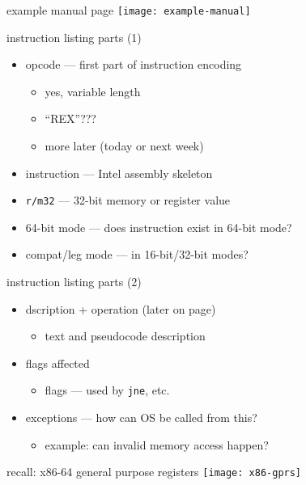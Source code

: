 \begin{frame}{example manual page}
\texttt{[image: example-manual]}
\end{frame}

\begin{frame}{instruction listing parts (1)}
    \begin{itemize}
    \item opcode --- first part of instruction encoding
        \begin{itemize}
        \item yes, variable length
        \item ``REX''???
        \item more later (today or next week)
        \end{itemize}
    \item instruction --- Intel assembly skeleton
    \item {\tt r/m32} --- 32-bit memory or register value
    \item 64-bit mode --- does instruction exist in 64-bit mode?
    \item compat/leg mode --- in 16-bit/32-bit modes?
    \end{itemize}
\end{frame}

\begin{frame}{instruction listing parts (2)}
    \begin{itemize}
    \item dscription + operation (later on page)
        \begin{itemize}
        \item text and pseudocode description
        \end{itemize}
    \item flags affected
        \begin{itemize}
        \item flags --- used by {\tt jne}, etc.
        \end{itemize}
    \item exceptions --- how can OS be called from this?
        \begin{itemize}
        \item example: can invalid memory access happen?
        \end{itemize}
    \end{itemize}
\end{frame}

\begin{frame}{recall: x86-64 general purpose registers}
\texttt{[image: x86-gprs]}
\end{frame}

